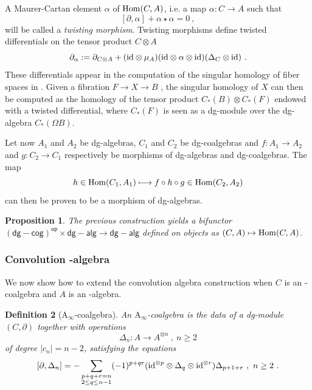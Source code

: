 \documentclass[twoside, 12pt]{amsart}
\newtheorem{definition}{Definition}[section]
\newtheorem{proposition}[definition]{Proposition}
\theoremstyle{remark}
\begin{document}
A Maurer-Cartan element $\alpha$ of $\mathrm{Hom} (C,A)$, i.e. a map $\alpha : C \rightarrow A$ such that 
\[ [ \partial , \alpha ] + \alpha \star \alpha  = 0 \ , \]
will be called a \emph{twisting morphism}. Twisting morphisms define twisted differentials on the tensor product $C \otimes A$
\[ \partial_\alpha := \partial_{C \otimes A} + (\mathrm{id} \otimes \mu_A ) ( \mathrm{id} \otimes \alpha \otimes \mathrm{id} ) ( \Delta_C \otimes \mathrm{id} ) \ . \]
These differentials appear in the computation of the singular homology of fiber spaces in \cite{Brown59}. 
Given a fibration $F \rightarrow X \rightarrow B$ , the singular homology of $X$ can then be computed as the homology of the tensor product $C_*(B) \otimes C_*(F)$ endowed with a twisted differential, where $C_*(F)$ is seen as a dg-module over the dg-algebra $C_*(\Omega B)$.

Let now $A_1$ and $A_2$ be dg-algebras, $C_1$ and $C_2$ be dg-coalgebras and $f : A_1 \rightarrow A_2$ and $g : C_2 \rightarrow C_1$ respectively be morphisms of dg-algebras and dg-coalgebras.
The map
\[ h \in \mathrm{Hom} (C_1 , A_1) \longmapsto f \circ h \circ g \in \mathrm{Hom} (C_2,A_2) \]
can then be proven to be a morphism of dg-algebras.

\begin{proposition}
The previous construction yields a bifunctor $\mathsf{(dg-cog)^{op}} \times \mathsf{dg-alg} \rightarrow \mathsf{dg-alg}$ defined on objects as $(C,A) \mapsto \mathrm{Hom} (C,A)$.
\end{proposition}

\subsubsection{Convolution \Ainf -algebra}

We now show how to extend the convolution algebra construction when $C$ is an \Ainf -coalgebra and $A$ is an \Ainf -algebra.

\begin{definition}[$\mathrm{A}_\infty$-coalgebra] \label{def:ainf-coalg} An \emph{$\mathrm{A}_\infty$-coalgebra} is the data of a dg-module $(C,\partial)$ together with operations \[ \Delta_n : A \to A^{\otimes n} \ , \ n \geq 2 \] of degree $|c_n|=n-2$, satisfying the equations 
\[ [ \partial , \Delta_n ] = - \sum_{\substack{p+q+r=n \\ 2 \leq q \leq n-1}} (-1)^{p+qr}(\mathrm{id}^{\otimes p} \otimes \Delta_q \otimes \mathrm{id}^{\otimes r})\Delta_{p+1+r} \ , \ n\geq 2 \ . \]
\end{definition}
\end{document}
